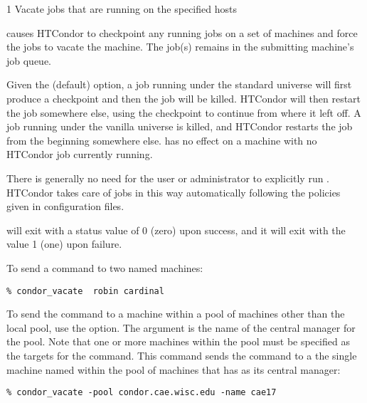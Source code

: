 \begin{ManPage}{\label{man-condor-vacate}}{1}
{Vacate jobs that are running on the specified hosts}
\Synopsis {}
\ToolArgsBase

\ToolDebugOption
\ToolWhere


\Description
{} causes HTCondor to checkpoint any running jobs
on a set of machines
and force the jobs to vacate the machine.
The job(s) remains in
the submitting machine's job queue. 

Given the (default)  option,
a job running under the standard universe
will first produce a checkpoint and then the job will be killed.
HTCondor will then restart the job somewhere else, using the checkpoint to
continue from where it left off.
A job running under the vanilla universe
is killed, and HTCondor
restarts the job from the beginning somewhere else.
 has no effect on a machine with 
no HTCondor job currently running. 

There is generally no need for the user or administrator to explicitly run
.
HTCondor takes care of jobs in this way
automatically following the policies given in configuration files.   

\begin{Options}
	\ToolArgsBaseDesc
	\ToolDebugDesc
	\ToolArgsLocateDesc
\end{Options}

\ExitStatus

 will exit with a status value of 0 (zero) upon success,
and it will exit with the value 1 (one) upon failure.

\Examples
To send a  command to two named machines:
\begin{verbatim}
% condor_vacate  robin cardinal
\end{verbatim}

To send the  command to a machine
within a pool of machines other than the local pool,
use the  option.
The argument is the name of the central manager for the pool.
Note that one or more machines within the pool must be
specified as the targets for the command.
This command sends the command to
a the single machine named  within the
pool of machines that has  as
its central manager:
\begin{verbatim}
% condor_vacate -pool condor.cae.wisc.edu -name cae17
\end{verbatim}

\end{ManPage}
